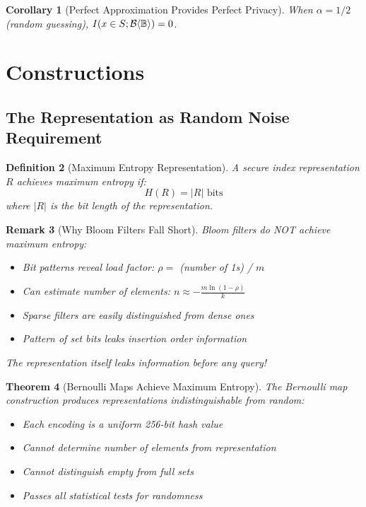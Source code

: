 \documentclass[11pt,final]{article}
\newcommand{\BernBool}{\mathcal{B}\langle \Bool \rangle}
\newcommand{\fprate}{\alpha}
\newtheorem{theorem}{Theorem}[section]
\newtheorem{corollary}[theorem]{Corollary}
\newtheorem{definition}[theorem]{Definition}
\newtheorem{remark}[theorem]{Remark}
\begin{document}
\begin{corollary}[Perfect Approximation Provides Perfect Privacy]
When $\fprate = 1/2$ (random guessing), $\MutInfo{x \in S}{\BernBool} = 0$.
\end{corollary}

\section{Constructions}

\subsection{The Representation as Random Noise Requirement}

\begin{definition}[Maximum Entropy Representation]
A secure index representation $R$ achieves maximum entropy if:
\begin{equation}
H(R) = |R| \text{ bits}
\end{equation}
where $|R|$ is the bit length of the representation.
\end{definition}

\begin{remark}[Why Bloom Filters Fall Short]
Bloom filters do NOT achieve maximum entropy:
\begin{itemize}
    \item Bit patterns reveal load factor: $\rho = $ (number of 1s) / $m$
    \item Can estimate number of elements: $n \approx -\frac{m \ln(1-\rho)}{k}$
    \item Sparse filters are easily distinguished from dense ones
    \item Pattern of set bits leaks insertion order information
\end{itemize}
The representation itself leaks information before any query!
\end{remark}

\begin{theorem}[Bernoulli Maps Achieve Maximum Entropy]
The Bernoulli map construction produces representations indistinguishable from random:
\begin{itemize}
    \item Each encoding is a uniform 256-bit hash value
    \item Cannot determine number of elements from representation
    \item Cannot distinguish empty from full sets
    \item Passes all statistical tests for randomness
\end{itemize}
\end{theorem}
\end{document}
